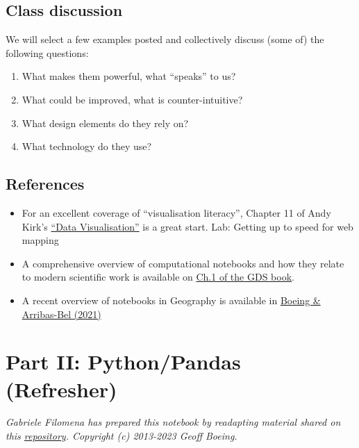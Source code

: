 \documentclass[
  letterpaper,
  DIV=11,
  numbers=noendperiod]{scrreprt}
\providecommand{\tightlist}{%
  \setlength{\itemsep}{0pt}\setlength{\parskip}{0pt}}\usepackage{longtable,booktabs,array}
\begin{document}
\hypertarget{class-discussion}{%
\subsection{Class discussion}\label{class-discussion}}

We will select a few examples posted and collectively discuss (some of)
the following questions:

\begin{enumerate}
\def\labelenumi{\arabic{enumi}.}
\tightlist
\item
  What makes them powerful, what ``speaks'' to us?
\item
  What could be improved, what is counter-intuitive?
\item
  What design elements do they rely on?
\item
  What technology do they use?
\end{enumerate}

\hypertarget{references}{%
\subsection{References}\label{references}}

\begin{itemize}
\tightlist
\item
  For an excellent coverage of ``visualisation literacy'', Chapter 11 of
  Andy Kirk's \href{https://www.visualisingdata.com/book/}{``Data
  Visualisation''} is a great start. Lab: Getting up to speed for web
  mapping
\item
  A comprehensive overview of computational notebooks and how they
  relate to modern scientific work is available on
  \href{https://geographicdata.science/book/notebooks/01_geo_thinking.html}{Ch.1
  of the GDS book}.
\item
  A recent overview of notebooks in Geography is available in
  \href{https://gistbok.ucgis.org/bok-topics/gis-and-computational-notebooks}{Boeing
  \& Arribas-Bel (2021)}
\end{itemize}

\hypertarget{part-ii-pythonpandas-refresher}{%
\section{Part II: Python/Pandas
(Refresher)}\label{part-ii-pythonpandas-refresher}}

\emph{Gabriele Filomena has prepared this notebook by readapting
material shared on this
\href{https://github.com/gboeing/ppd599/tree/main}{repository}.
Copyright (c) 2013-2023 Geoff Boeing.}
\end{document}
